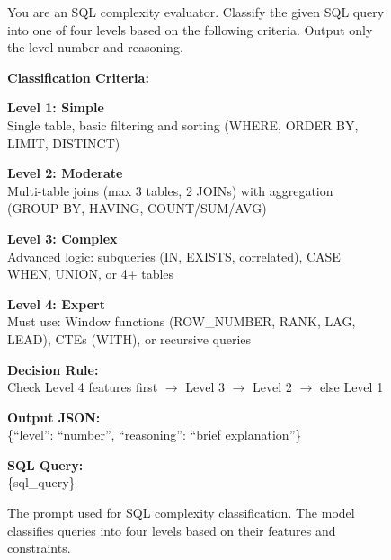 \documentclass[letterpaper,journal]{IEEEtran}
\begin{document}
\begin{figure}[!ht]
\centering
\begin{tcolorbox}[
  enhanced,
  boxrule=0.5pt,
  colback=AliceBlue,
  colframe=Navy,
  colbacktitle=Navy,
  fonttitle=\bfseries\color{white}, 
  title=Prompt for SQL Complexity Classification,
  arc=2mm,
  attach boxed title to top left={yshift=-2.5mm, xshift=3mm},
  boxed title style={arc=1mm},
  boxsep=5pt,
  left=8pt,
  right=8pt,
  top=6mm,
]
\scriptsize\ttfamily  
You are an SQL complexity evaluator. Classify the given SQL query into one of four levels based on the following criteria. Output only the level number and reasoning.

\vspace{1.5ex}
\textbf{Classification Criteria:}

\vspace{0.5ex}
\textbf{Level 1: Simple}\\
Single table, basic filtering and sorting (WHERE, ORDER BY, LIMIT, DISTINCT)

\vspace{0.5ex}
\textbf{Level 2: Moderate}\\
Multi-table joins (max 3 tables, 2 JOINs) with aggregation (GROUP BY, HAVING, COUNT/SUM/AVG)

\vspace{0.5ex}
\textbf{Level 3: Complex}\\
Advanced logic: subqueries (IN, EXISTS, correlated), CASE WHEN, UNION, or 4+ tables

\vspace{0.5ex}
\textbf{Level 4: Expert}\\
Must use: Window functions (ROW\_NUMBER, RANK, LAG, LEAD), CTEs (WITH), or recursive queries

\vspace{1.5ex}
\textbf{Decision Rule:}\\
Check Level 4 features first $\rightarrow$ Level 3 $\rightarrow$ Level 2 $\rightarrow$ else Level 1

\vspace{1.5ex}
\textbf{Output JSON:}\\
\{``level'': ``number'', ``reasoning'': ``brief explanation''\}

\vspace{1.5ex}
\textbf{SQL Query:}\\
\{sql\_query\}
\end{tcolorbox}
\caption{The prompt used for SQL complexity classification. The model classifies queries into four levels based on their features and constraints.}
\label{fig:prompt_sql_complexity}
\end{figure}
\end{document}
